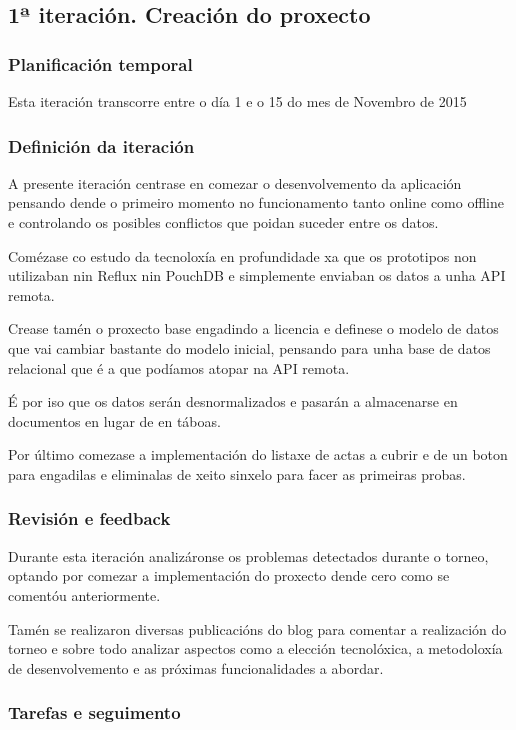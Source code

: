     \subsection{1ª iteración. Creación do proxecto}

      \subsubsection{Planificación temporal}
  Esta iteración transcorre entre o día 1 e o 15 do mes de Novembro de 2015

      \subsubsection{Definición da iteración}
      A presente iteración centrase en comezar o desenvolvemento da 
aplicación pensando dende o primeiro momento no funcionamento tanto online 
como offline e controlando os posibles conflictos que poidan suceder entre os 
datos.

      Comézase co estudo da tecnoloxía en profundidade xa que os 
prototipos non utilizaban nin Reflux nin PouchDB e simplemente enviaban os 
datos a unha API remota.

      Crease tamén o proxecto base engadindo a licencia e definese o modelo de 
datos que vai cambiar bastante do modelo inicial, pensando para unha base de 
datos relacional que é a que podíamos atopar na API remota.

      É por iso que os datos serán desnormalizados e pasarán a almacenarse en 
documentos en lugar de en táboas.

      Por último comezase a implementación do listaxe de actas a cubrir e de un 
boton para engadilas e eliminalas de xeito sinxelo para facer as primeiras 
probas.
      \subsubsection{Revisión e feedback}
      Durante esta iteración analizáronse os problemas detectados durante o 
torneo, optando por comezar a implementación do proxecto dende cero como se 
comentóu anteriormente.

      Tamén se realizaron diversas publicacións do blog para comentar a 
realización do torneo e sobre todo analizar aspectos como a elección 
tecnolóxica, a metodoloxía de desenvolvemento e as próximas funcionalidades a 
abordar.

      \subsubsection{Tarefas e seguimento}

